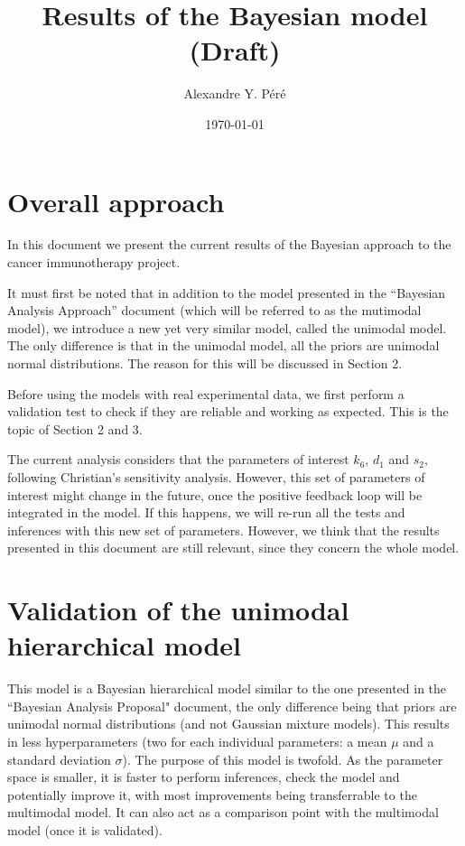 \documentclass[11pt]{article}
\title{Results of the Bayesian model (Draft)}
\author{Alexandre Y. Péré}
\date{\today}
\begin{document}
    \maketitle
    
    \section{Overall approach}
    In this document we present the current results of the Bayesian approach to the cancer immunotherapy project. 

    It must first be noted that in addition to the model presented in the ``Bayesian Analysis Approach'' document (which will be referred to as the mutimodal model), we introduce a new yet very similar model, called the unimodal model. The only difference is that in the unimodal model, all the priors are unimodal normal distributions. The reason for this will be discussed in Section 2. 

    Before  using the models with real experimental data, we first perform a validation test to check if they are reliable and working as expected. This is the topic of Section 2 and 3.

    The current analysis considers that the parameters of interest $k_6$, $d_1$ and $s_2$, following Christian's sensitivity analysis. However, this set of parameters of interest might change in the future, once the positive feedback loop will be integrated in the model. If this happens, we will re-run all the tests and inferences with this new set of parameters. However, we think that the results presented in this document are still relevant, since they concern the whole model.


    \section{Validation of the unimodal hierarchical model}
    This model is a Bayesian hierarchical model similar to the one presented in the ``Bayesian Analysis Proposal" document, the only difference being that priors are unimodal normal distributions (and not Gaussian mixture models). This results in less hyperparameters (two for each individual parameters: a mean $\mu$ and a standard deviation $\sigma$). The purpose of this model is twofold. As the parameter space is smaller, it is faster to perform inferences, check the model and potentially improve it, with most improvements being transferrable to the multimodal model. It can also act as a comparison point with the multimodal model (once it is validated).
    
\end{document}
